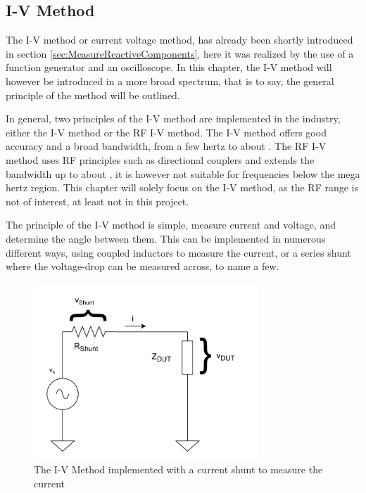 \subsection{I-V Method} \label{ssec:IVMethod}
The I-V method or current voltage method, has already been shortly introduced in section \ref{sec:MeasureReactiveComponents}, here it was realized by the use of a function generator and an oscilloscope. In this chapter, the I-V method will however be introduced in a more broad spectrum, that is to say, the general principle of the method will be outlined.

In general, two principles of the I-V method are implemented in the industry, either the I-V method or the RF I-V method. The I-V method offers good accuracy 
and a broad bandwidth, from a few hertz to about . The RF I-V method uses RF principles such as directional couplers and extends the bandwidth up to about , it is however not suitable for frequencies below the mega hertz region\cite{Keysight_Impedance}. This chapter will solely focus on the I-V method, as the RF range is not of interest, at least not in this project.

The principle of the I-V method is simple, measure current and voltage, and determine the angle between them. This can be implemented in numerous different ways, using coupled inductors to measure the current, or a series shunt where the voltage-drop can be measured across, to name a few. 

\begin{figure}[H]
    \centering
    \includegraphics[width=0.75\textwidth]{Sections/4_TechnicalAnalysis/Figures_JFT/IV_Method.pdf}
    \caption{The I-V Method implemented with a current shunt to measure the current}
    \label{fig_4_2_IVMethod}
\end{figure}

